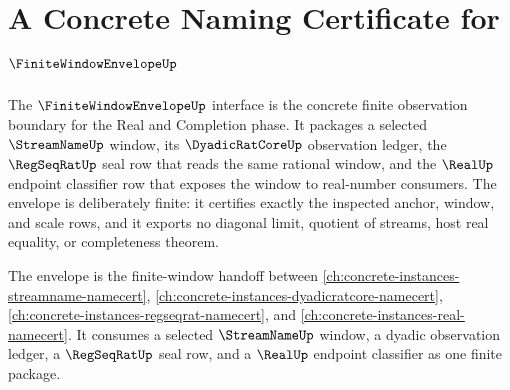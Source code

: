 \chapter{A Concrete Naming Certificate for $\FiniteWindowEnvelopeUp$}
\label{ch:concrete-instances-finitewindowenvelope-namecert}

The $\FiniteWindowEnvelopeUp$ interface is the concrete finite observation boundary for the Real and Completion phase. It packages a selected $\StreamNameUp$ window, its $\DyadicRatCoreUp$ observation ledger, the $\RegSeqRatUp$ seal row that reads the same rational window, and the $\RealUp$ endpoint classifier row that exposes the window to real-number consumers. The envelope is deliberately finite: it certifies exactly the inspected anchor, window, and scale rows, and it exports no diagonal limit, quotient of streams, host real equality, or completeness theorem.

The envelope is the finite-window handoff between \autoref{ch:concrete-instances-streamname-namecert}, \autoref{ch:concrete-instances-dyadicratcore-namecert}, \autoref{ch:concrete-instances-regseqrat-namecert}, and \autoref{ch:concrete-instances-real-namecert}. It consumes a selected $\StreamNameUp$ window, a dyadic observation ledger, a $\RegSeqRatUp$ seal row, and a $\RealUp$ endpoint classifier as one finite package.

